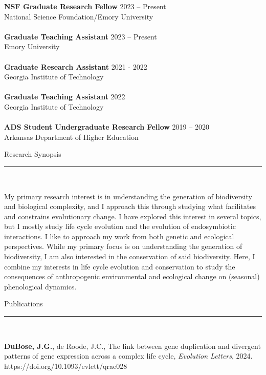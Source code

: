 \documentclass{article}
\begin{document}
\textbf{NSF Graduate Research Fellow} \hfill 2023 – Present \\
National Science Foundation/Emory University
\\
\\
\textbf{Graduate Teaching Assistant} \hfill 2023 – Present \\
Emory University
\\
\\
\textbf{Graduate Research Assistant} \hfill 2021 - 2022 \\
Georgia Institute of Technology
\\
\\
\textbf{Graduate Teaching Assistant} \hfill 2022 \\
Georgia Institute of Technology
\\
\\
\textbf{ADS Student Undergraduate Research Fellow} \hfill 2019 – 2020 \\
Arkansas Department of Higher Education
\\
\begin{flushleft}
{\Large Research Synopsis} \rule{16.51cm}{0.4pt}\\
\end{flushleft}
My primary research interest is in understanding the generation of biodiversity and biological complexity,
and I approach this through studying what facilitates and constrains evolutionary change. I have explored
this interest in several topics, but I mostly study life cycle evolution and the evolution of endosymbiotic
interactions. I like to approach my work from both genetic and ecological perspectives. While my primary
focus is on understanding the generation of biodiversity, I am also interested in the conservation of said 
biodiversity. Here, I combine my interests in life cycle evolution and conservation to study the consequences
of anthropogenic environmental and ecological change on (seasonal) phenological dynamics. 
\\

\begin{flushleft}
{\Large Publications} \rule{16.51cm}{0.4pt}\\
\end{flushleft}

\hangindent=0.7cm \textbf{DuBose, J.G.}, de Roode, J.C., The link between gene duplication and divergent patterns of gene expression across a complex life cycle, \emph{Evolution Letters}, 2024. https://doi.org/10.1093/evlett/qrae028 \\
\end{document}
